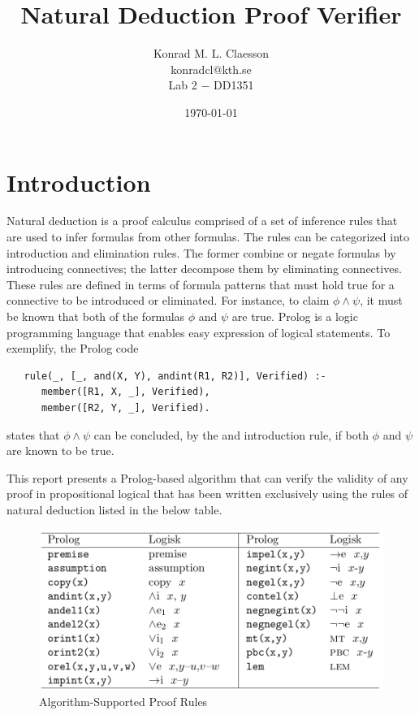 \documentclass[a4paper, 11pt]{article}
\title{Natural Deduction Proof Verifier}
\author{Konrad M. L. Claesson\\ konradcl@kth.se\\ 
Lab 2 $-$ DD1351}
\date{\today}
\begin{document}
   \maketitle

   \section{Introduction}
   Natural deduction is a proof calculus comprised of a set of
   inference rules that are used to infer formulas from other
   formulas. The rules can be categorized into introduction
   and elimination rules. The former combine or negate
   formulas by introducing connectives; the latter decompose
   them by eliminating connectives. These rules are defined in
   terms of formula patterns that must hold true for a 
   connective to be introduced or eliminated. For instance, to
   claim $\phi \wedge \psi$, it must be known that
   both of the formulas $\phi$ and $\psi$ are true. Prolog is
   a logic programming language that enables easy expression 
   of logical statements. To exemplify, the Prolog code
   
\begin{verbatim}
   rule(_, [_, and(X, Y), andint(R1, R2)], Verified) :-
      member([R1, X, _], Verified),
      member([R2, Y, _], Verified).
\end{verbatim}
   
   states that $\phi \wedge \psi$ can be concluded, by the and
   introduction rule, if both $\phi$ and $\psi$ are known to
   be true. 
   \bigbreak

   This report presents a Prolog-based algorithm that can
   verify the validity of any proof in propositional logical 
   that has been written exclusively using the rules of
   natural deduction listed in the below table.

   \begin{figure}
      \centering
      \includegraphics[scale=0.325]{inference-rules}
      \caption{Algorithm-Supported Proof Rules}
   \end{figure}
\end{document}
